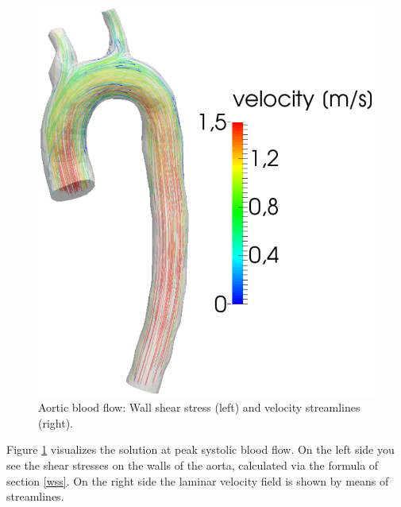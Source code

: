 \documentclass[a4paper, 11pt, twoside]{article}
\begin{document}
\begin{figure}[H]
\begin{minipage}{0.53\textwidth}
  \includegraphics[width=\textwidth]{fig/aorta_streamlines.png}
  \end{minipage}
\caption{Aortic blood flow: Wall shear stress (left) and velocity streamlines (right).}
 \label{aorta}
\end{figure}

Figure \ref{aorta} visualizes the solution at peak systolic blood flow. On the left side you see the shear stresses on the walls of the aorta, calculated via the formula of section \ref{wss}. On the right side the laminar velocity field is shown by means of streamlines.

\newpage
\appendix
\end{document}
